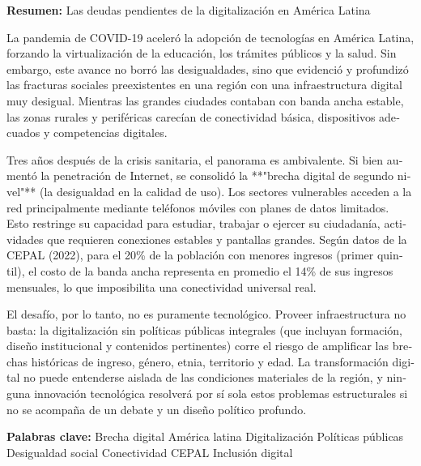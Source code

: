 \begin{tcolorbox}[colback=brown!8!white,colframe=brown!8!white,boxrule=0pt,arc=2pt,left=4pt,right=4pt,top=3pt,bottom=3pt,before skip=4pt,after skip=4pt]
\begin{otherlanguage}{spanish}
\sffamily\small \textbf{Resumen:} Las deudas pendientes de la digitalización en América Latina

La pandemia de COVID-19 aceleró la adopción de tecnologías en América Latina, forzando la virtualización de la educación, los trámites públicos y la salud. Sin embargo, este avance no borró las desigualdades, sino que evidenció y profundizó las fracturas sociales preexistentes en una región con una infraestructura digital muy desigual. Mientras las grandes ciudades contaban con banda ancha estable, las zonas rurales y periféricas carecían de conectividad básica, dispositivos adecuados y competencias digitales.

Tres años después de la crisis sanitaria, el panorama es ambivalente. Si bien aumentó la penetración de Internet, se consolidó la **"brecha digital de segundo nivel"** (la desigualdad en la calidad de uso). Los sectores vulnerables acceden a la red principalmente mediante teléfonos móviles con planes de datos limitados. Esto restringe su capacidad para estudiar, trabajar o ejercer su ciudadanía, actividades que requieren conexiones estables y pantallas grandes. Según datos de la CEPAL (2022), para el 20\% de la población con menores ingresos (primer quintil), el costo de la banda ancha representa en promedio el 14\% de sus ingresos mensuales, lo que imposibilita una conectividad universal real.

El desafío, por lo tanto, no es puramente tecnológico. Proveer infraestructura no basta: la digitalización sin políticas públicas integrales (que incluyan formación, diseño institucional y contenidos pertinentes) corre el riesgo de amplificar las brechas históricas de ingreso, género, etnia, territorio y edad. La transformación digital no puede entenderse aislada de las condiciones materiales de la región, y ninguna innovación tecnológica resolverá por sí sola estos problemas estructurales si no se acompaña de un debate y un diseño político profundo.
\par\smallskip\noindent\textbf{Palabras clave:} Brecha digital América latina Digitalización Políticas públicas Desigualdad social Conectividad CEPAL Inclusión digital
\end{otherlanguage}
\end{tcolorbox}

